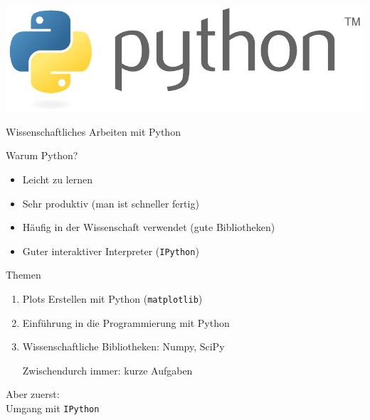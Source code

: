 \begin{frame}
  \includegraphics[width=\textwidth]{logos/python.pdf}
\end{frame}

\begin{frame}
  \centering
  \Huge Wissenschaftliches Arbeiten mit Python
\end{frame}

\begin{frame}{Warum Python?}
  \begin{itemize}
    \item Leicht zu lernen
    \item Sehr produktiv (man ist schneller fertig)
    \item Häufig in der Wissenschaft verwendet (gute Bibliotheken)
    \item Guter interaktiver Interpreter (\texttt{IPython})
  \end{itemize}
\end{frame}

\begin{frame}{Themen}
  \begin{enumerate}
    \item {\large Plots Erstellen mit Python (\texttt{matplotlib})}
    \item {\large Einführung in die Programmierung mit Python}
    \item {\large Wissenschaftliche Bibliotheken: Numpy, SciPy}

    Zwischendurch immer: kurze Aufgaben
  \end{enumerate}
\end{frame}

\begin{frame}
  \centering
  \Huge Aber zuerst:\\ Umgang mit \texttt{IPython}
\end{frame}
